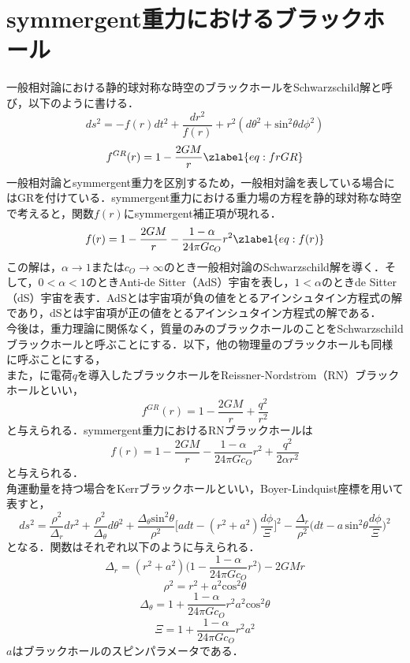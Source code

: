 \section{symmergent重力におけるブラックホール}
一般相対論における静的球対称な時空のブラックホールをSchwarzschild解と呼び，以下のように書ける．
\begin{dmath}
    ds^2=-f(r)dt^2+\frac{d r^2}{f(r)}+r^2(d\theta^2+\mathrm{sin}^2\theta d\phi^2)
\end{dmath}
\begin{dmath}
    f^{GR}(r)=1-\frac{2GM}{r}
    \zlabel{eq:frGR}
\end{dmath}
一般相対論とsymmergent重力を区別するため，一般相対論を表している場合にはGRを付けている．symmergent重力における重力場の方程を静的球対称な時空で考えると，関数$f(r)$にsymmergent補正項が現れる．
\begin{dmath}
    f(r)=1-\frac{2GM}{r}-\frac{1-\alpha}{24\pi Gc_O}r^2
    \zlabel{eq:f(r)}
\end{dmath}
この解は，$\alpha\to 1$または$c_O\to\infty$のとき一般相対論のSchwarzschild解を導く．そして，$0<\alpha<1$のときAnti-de Sitter（AdS）宇宙を表し，$1<\alpha$のときde Sitter（dS）宇宙を表す．AdSとは宇宙項が負の値をとるアインシュタイン方程式の解であり，dSとは宇宙項が正の値をとるアインシュタイン方程式の解である．
\\今後は，重力理論に関係なく，質量のみのブラックホールのことをSchwarzschildブラックホールと呼ぶことにする．以下，他の物理量のブラックホールも同様に呼ぶことにする，
\\また，に電荷$q$を導入したブラックホールをReissner-Nordstr$\mathrm{\ddot{o}}$m（RN）ブラックホールといい，
\begin{dmath}
    f^{GR}(r)=1-\frac{2GM}{r}+\frac{q^2}{r^2}
\end{dmath}
と与えられる．symmergent重力におけるRNブラックホールは
\begin{dmath}
    f(r)=1-\frac{2GM}{r}-\frac{1-\alpha}{24\pi Gc_O}r^2+\frac{q^2}{2\alpha r^2}
\end{dmath}
と与えられる．
\\角運動量を持つ場合をKerrブラックホールといい，Boyer-Lindquist座標を用いて表すと，
\begin{equation}
    ds^2=\frac{\rho^2}{\Delta_r}dr^2+\frac{\rho^2}{\Delta_\theta}d\theta^2+\frac{\Delta_\theta \mathrm{sin}^2\theta}{\rho^2}\bigg[adt-(r^2+a^2)\frac{d\phi}{\Xi}\bigg]^2-\frac{\Delta_r}{\rho^2}\bigg(dt-a\,\mathrm{sin}^2\theta\frac{d\phi}{\Xi}\bigg)^2
\end{equation}
となる．関数はそれぞれ以下のように与えられる．
\begin{dmath}
    \Delta_r=(r^2+a^2)\bigg(1-\frac{1-\alpha}{24\pi Gc_O}r^2\bigg)-2GMr
\end{dmath}
\begin{dmath}
    \rho^2=r^2+a^2\mathrm{cos}^2\theta
\end{dmath}
\begin{dmath}
    \Delta_\theta=1+\frac{1-\alpha}{24\pi Gc_O}r^2a^2\mathrm{cos}^2\theta
\end{dmath}
\begin{dmath}
    \Xi=1+\frac{1-\alpha}{24\pi Gc_O}r^2a^2
\end{dmath}
$a$はブラックホールのスピンパラメータである．


